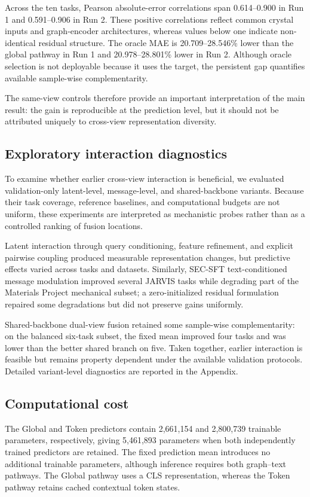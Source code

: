 \documentclass[a4paper,fleqn]{cas-sc}
\begin{document}
Across the ten tasks, Pearson absolute-error correlations span 0.614--0.900 in Run 1 and 0.591--0.906 in Run 2. These positive correlations reflect common crystal inputs and graph-encoder architectures, whereas values below one indicate non-identical residual structure. The oracle MAE is 20.709--28.546\% lower than the global pathway in Run 1 and 20.978--28.801\% lower in Run 2. Although oracle selection is not deployable because it uses the target, the persistent gap quantifies available sample-wise complementarity.

The same-view controls therefore provide an important interpretation of the main result: the gain is reproducible at the prediction level, but it should not be attributed uniquely to cross-view representation diversity.

\FloatBarrier
\subsection{Exploratory interaction diagnostics}
To examine whether earlier cross-view interaction is beneficial, we evaluated validation-only latent-level, message-level, and shared-backbone variants. Because their task coverage, reference baselines, and computational budgets are not uniform, these experiments are interpreted as mechanistic probes rather than as a controlled ranking of fusion locations.

Latent interaction through query conditioning, feature refinement, and explicit pairwise coupling produced measurable representation changes, but predictive effects varied across tasks and datasets. Similarly, SEC-SFT text-conditioned message modulation improved several JARVIS tasks while degrading part of the Materials Project mechanical subset; a zero-initialized residual formulation repaired some degradations but did not preserve gains uniformly.

Shared-backbone dual-view fusion retained some sample-wise complementarity: on the balanced six-task subset, the fixed mean improved four tasks and was lower than the better shared branch on five. Taken together, earlier interaction is feasible but remains property dependent under the available validation protocols. Detailed variant-level diagnostics are reported in the Appendix.


\subsection{Computational cost}
The Global and Token predictors contain 2,661,154 and 2,800,739 trainable parameters, respectively, giving 5,461,893 parameters when both independently trained predictors are retained. The fixed prediction mean introduces no additional trainable parameters, although inference requires both graph--text pathways. The Global pathway uses a CLS representation, whereas the Token pathway retains cached contextual token states.
\end{document}
